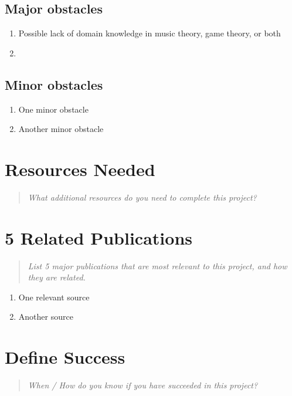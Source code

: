 \documentclass{proc}
\begin{document}
\subsection{Major obstacles} %

\begin{enumerate} 
\item Possible lack of domain knowledge in music theory, game theory, or both
\item 
\end{enumerate}

\subsection{Minor obstacles}

\begin{enumerate} 
\item One minor obstacle
\item Another minor obstacle
\end{enumerate}

\section{Resources Needed}
\begin{quote}
\textit{What additional resources do you need to complete this project?}
\end{quote}


\section{5 Related Publications}
\begin{quote}
\textit{List 5 major publications that are most relevant to this project, and how they are related.}
\end{quote}

\begin{enumerate} 
\item One relevant source
\item Another source
\end{enumerate}

\section{Define Success}
\begin{quote}
\textit{When / How do you know if you have succeeded in this project?}
\end{quote}



\end{document}
